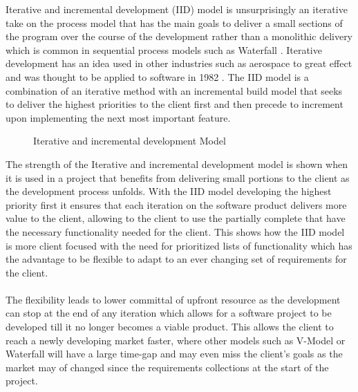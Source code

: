 \documentclass{style/CRPITStyle}
\renewcommand{\cite}{\citep}
\begin{document}
Iterative and incremental development (IID) model is unsurprisingly an iterative take on the
process model that has the main goals to deliver a small sections of the program
over the course of the development rather than a monolithic delivery which is
common in sequential process models such as Waterfall \cite{greer:2004:iid}.
Iterative development has an idea used in other industries such as aerospace to 
great effect and was thought to be applied to software in 1982 \cite{larman:2003:iid}.
The IID model is a combination of an iterative method with an incremental build
model that seeks to deliver the highest priorities to the client first and then
precede to increment upon implementing the next most important feature.

\vspace{.1in}

\begin{figure}[htb]
\caption{\protect\label{iid} Iterative and incremental development Model}
\end{figure}

\vspace{.1in}

The strength of the Iterative and incremental development model is shown when it
is used in a project that benefits from delivering small portions to the client
as the development process unfolds. With the IID model developing the highest
priority first it ensures that each iteration on the software product delivers
more value to the client, allowing to the client to use the partially complete
that have the necessary functionality needed for the client.
This shows how the IID model is more client focused with the need for
prioritized lists of functionality which has the advantage to be flexible to
adapt to an ever changing set of requirements for the client.

\paragraph{}

The flexibility leads to lower committal of upfront resource as the development
can stop at the end of any iteration which allows for a software project to be
developed till it no longer becomes a viable product.
This allows the client to reach a newly developing market faster, where other
models such as V-Model or Waterfall will have a large time-gap and may even miss
the client's goals as the market may of changed since the requirements
collections at the start of the project.
\end{document}
